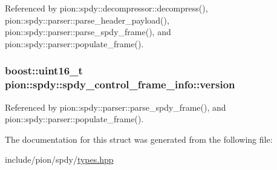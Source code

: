 Referenced by pion\-::spdy\-::decompressor\-::decompress(), pion\-::spdy\-::parser\-::parse\-\_\-header\-\_\-payload(), pion\-::spdy\-::parser\-::parse\-\_\-spdy\-\_\-frame(), and pion\-::spdy\-::parser\-::populate\-\_\-frame().

\hypertarget{structpion_1_1spdy_1_1spdy__control__frame__info_a4616ceeb89c9fc021558ff10d956fa87}{
\subsubsection[{version}]{\setlength{\rightskip}{0pt plus 5cm}boost\-::uint16\-\_\-t pion\-::spdy\-::spdy\-\_\-control\-\_\-frame\-\_\-info\-::version}}\label{structpion_1_1spdy_1_1spdy__control__frame__info_a4616ceeb89c9fc021558ff10d956fa87}


Referenced by pion\-::spdy\-::parser\-::parse\-\_\-spdy\-\_\-frame(), and pion\-::spdy\-::parser\-::populate\-\_\-frame().



The documentation for this struct was generated from the following file\-:\begin{DoxyCompactItemize}
\item 
include/pion/spdy/\hyperlink{spdy_2types_8hpp}{types.\-hpp}\end{DoxyCompactItemize}
